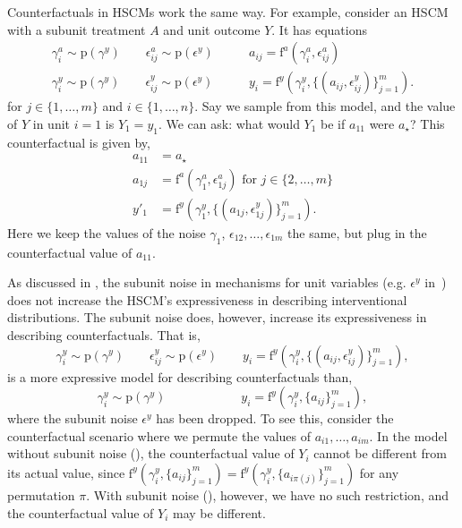 \documentclass[12pt]{article}
\newcommand{\pr}{\mathrm{p}}
\newcommand{\f}{\mathrm{f}}
\begin{document}
Counterfactuals in HSCMs work the same way. For example, consider an HSCM with a subunit treatment $A$ and unit outcome $Y$. It has equations
\begin{equation} \label{eqn:counterfactual_ex}
\begin{split}
\gamma_i^a \sim \pr(\gamma^y)
  \quad \quad
    \epsilon_{ij}^a \sim \pr(\epsilon^y)
  \quad \quad
    & a_{ij} = \f^a(\gamma_i^a, \epsilon^a_{ij})\\
	\gamma_i^y \sim \pr(\gamma^y)
  \quad \quad
    \epsilon_{ij}^y \sim \pr(\epsilon^y)
  \quad \quad
    & y_{i} = \f^y(\gamma_i^y, \{(a_{ij}, \epsilon^y_{ij})\}_{j=1}^m).
\end{split}
\end{equation}
for $j \in \{1, \ldots, m\}$ and $i \in \{1, \ldots, n\}$.
Say we sample from this model, and the value of $Y$ in unit $i = 1$ is $Y_1 = y_1$. We can ask:
what would $Y_1$ be if $a_{1 1}$ were $a_\star$? This counterfactual is given by,
\begin{equation}
\begin{split}
a_{1 1} &= a_\star\\
 a_{1j} &= \f^a(\gamma_1^a, \epsilon^a_{1j}) \text{ for } j \in \{2,\ldots, m\}\\
y'_1 &= \f^y(\gamma_1^y, \{(a_{1j}, \epsilon^y_{1j})\}_{j=1}^m).
\end{split}
\end{equation}
Here we keep the values of the noise $\gamma_1$, $\epsilon_{12}, \ldots, \epsilon_{1m}$ the same, but plug in the counterfactual value of $a_{1 1}$.

As discussed in , the subunit noise in mechanisms for unit variables (e.g. $\epsilon^y$ in~) does not increase the HSCM's expressiveness in describing interventional distributions.
The subunit noise does, however, increase its expressiveness in describing counterfactuals.
That is, 
\begin{equation} \label{eqn:counterfact_subunit_noise}
	\gamma_i^y \sim \pr(\gamma^y)
  \quad \quad
    \epsilon_{ij}^y \sim \pr(\epsilon^y)
  \quad \quad
    y_{i} = \f^y(\gamma_i^y, \{(a_{ij}, \epsilon^y_{ij})\}_{j=1}^m),
\end{equation}
is a more expressive model for describing counterfactuals than,
\begin{equation} \label{eqn:counterfact_no_subunit_noise}
	\gamma_i^y \sim \pr(\gamma^y)
  \quad \quad
  \quad \quad
  \quad \quad
    y_{i} = \f^y(\gamma_i^y, \{a_{ij}\}_{j=1}^m),
\end{equation}
where the subunit noise $\epsilon^y$ has been dropped. To see this, consider the counterfactual scenario where we permute the values of $a_{i1}, \ldots, a_{im}$.
In the model without subunit noise (), the counterfactual value of $Y_i$ cannot be different from its actual value, since $\f^y(\gamma_i^y, \{a_{ij}\}_{j=1}^m) = \f^y(\gamma_i^y, \{a_{i\pi(j)}\}_{j=1}^m)$ for any permutation $\pi$.
With subunit noise (), however, we have no such restriction, and the counterfactual value of $Y_i$ may be different.
\end{document}
